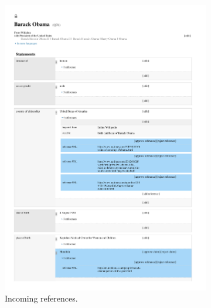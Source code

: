 \documentclass{acm_proc_article-sp}
\begin{document}
\begin{figure}[!t]
    \centering
    \begin{subfigure}[b]{1.0\columnwidth}
        \includegraphics[width=\textwidth]{img/primary-sources.pdf}
        \caption{Incoming references.}
        \label{fig:barack-obama}
    \end{subfigure}
    \begin{subfigure}[b]{1.0\columnwidth}

\end{subfigure}
\end{figure}
\end{document}
